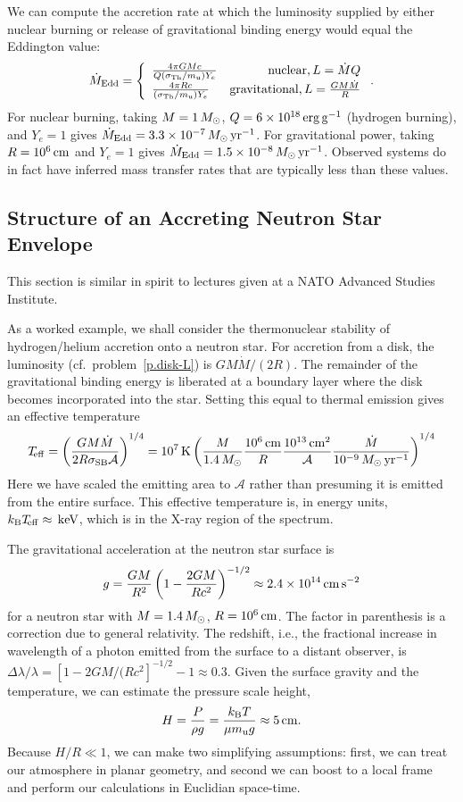 We can compute the accretion rate at which the luminosity supplied by either nuclear burning or release of gravitational binding energy would equal the Eddington value:
\[
\dot{M}_{\mathrm{Edd}} = \left\{\begin{array}{lr}
	\frac{4\pi GM c}{Q(\sigma_{\mathrm{Th}}/m_\mathrm{u})Y_{e}}  & \textrm{nuclear,}\, L = \dot{M}Q \\
	\frac{4\pi R c}{(\sigma_{\mathrm{Th}}/m_\mathrm{u})Y_{e}} & \textrm{gravitational,}\, L= \frac{GM\dot{M}}{R}
\end{array}\right. .
\]
For nuclear burning, taking $M = 1\,M_\odot$, $Q = 6\times 10^{18}\,\mathrm{erg}\,{\mathrm{g}}^{-1}$ (hydrogen burning), and $Y_{e} = 1$ gives $\dot{M}_{\mathrm{Edd}} = 3.3\times 10^{-7}\,M_\odot\,\mathrm{yr}^{-1}$.  For gravitational power, taking $R = 10^{6}\,\mathrm{c}\mathrm{m}$ and $Y_{e} = 1$ gives $\dot{M}_{\mathrm{Edd}} = 1.5\times 10^{-8}\,M_\odot\,\mathrm{yr}^{-1}$.  Observed systems do in fact have inferred mass transfer rates that are typically less than these values.

\subsection[Accreting Neutron Star Envelopes]{Structure of an Accreting Neutron Star Envelope}

This section is similar in spirit to lectures \citep{bildsten:thermonuclear} given at a NATO Advanced Studies Institute.

As a worked example, we shall consider the thermonuclear stability of hydrogen/helium accretion onto a neutron star.  For accretion from a disk, the luminosity (cf.\ problem~\ref{p.disk-L}) is $GM\dot{M}/(2R)$.  The remainder of the gravitational binding energy is liberated at a boundary layer where the disk becomes incorporated into the star.  Setting this equal to thermal emission gives an effective temperature
\[
	T_{\!\mathrm{eff}} = \left(\frac{GM\dot{M}}{2R\sigma_{\mathrm{SB}}\mathcal{A}}\right)^{1/4} = 10^{7}\,\mathrm{K} \left(\frac{M}{1.4\,M_\odot}\frac{10^{6}\,\mathrm{c}\mathrm{m}}{R}\frac{10^{13}\,\mathrm{c}\mathrm{m}^{2}}{\mathcal{A}}\frac{\dot{M}}{10^{-9}\,M_\odot\,\mathrm{yr}^{-1}}\right)^{1/4}
\]
Here we have scaled the emitting area to $\mathcal{A}$ rather than presuming it is emitted from the entire surface. This effective temperature is, in energy units, $k_\mathrm{B} T_{\!\mathrm{eff}}\approx \,\mathrm{k}\mathrm{eV}$, which is in the X-ray region of the spectrum.  

The gravitational acceleration at the neutron star surface is
\[
	g = \frac{GM}{R^{2}}\left(1-\frac{2GM}{Rc^{2}}\right)^{-1/2}\approx 2.4\times 10^{14}\,\mathrm{c}\mathrm{m}\,\mathrm{s}^{-2}
\]
for a neutron star with $M = 1.4\,M_\odot$, $R = 10^{6}\,\mathrm{c}\mathrm{m}$.  The factor in parenthesis is a correction due to general relativity. The redshift, i.e., the fractional increase in wavelength of a photon emitted from the surface to a distant observer, is $\Delta \lambda/\lambda = [1-2GM/(Rc^{2}]^{-1/2} - 1 \approx 0.3$.   Given the surface gravity and the temperature, we can estimate the pressure scale height,
\[
 H = \frac{P}{\rho g} = \frac{k_\mathrm{B} T}{\mu m_\mathrm{u} g} \approx 5\,\mathrm{c}\mathrm{m}.
\]
Because $H/R\ll 1$, we can make two simplifying assumptions: first, we can treat our atmosphere in planar geometry, and second we can boost to a local frame and perform our calculations in Euclidian space-time.


